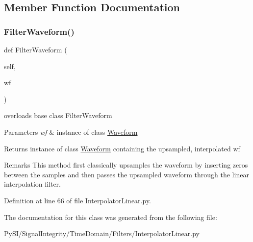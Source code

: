\subsection{Member Function Documentation}
\mbox{\label{classSignalIntegrity_1_1TimeDomain_1_1Filters_1_1InterpolatorLinear_1_1InterpolatorLinear_a84e73c18250ca4a61482f94ad61e735b}} 
\subsubsection{\texorpdfstring{Filter\+Waveform()}{FilterWaveform()}}
{\footnotesize\ttfamily def Filter\+Waveform (\begin{DoxyParamCaption}\item[{}]{self,  }\item[{}]{wf }\end{DoxyParamCaption})}



overloads base class Filter\+Waveform 


\begin{DoxyParams}{Parameters}
{\em wf} & instance of class \hyperlink{namespaceSignalIntegrity_1_1TimeDomain_1_1Waveform}{Waveform} \\
\hline
\end{DoxyParams}
\begin{DoxyReturn}{Returns}
instance of class \hyperlink{namespaceSignalIntegrity_1_1TimeDomain_1_1Waveform}{Waveform} containing the upsampled, interpolated wf 
\end{DoxyReturn}
\begin{DoxyRemark}{Remarks}
This method first classically upsamples the waveform by inserting zeros between the samples and then passes the upsampled waveform through the linear interpolation filter. 
\end{DoxyRemark}


Definition at line 66 of file Interpolator\+Linear.\+py.



The documentation for this class was generated from the following file\+:\begin{DoxyCompactItemize}
\item 
Py\+S\+I/\+Signal\+Integrity/\+Time\+Domain/\+Filters/Interpolator\+Linear.\+py\end{DoxyCompactItemize}
